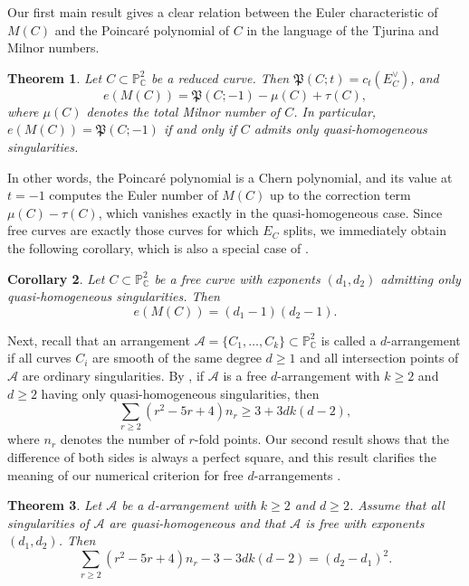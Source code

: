 \documentclass[11pt]{amsart}
\newtheorem{theorem}{Theorem}[section]
\newtheorem{corollary}[theorem]{Corollary}
\theoremstyle{definition}
\numberwithin{equation}{section}
\newcommand{\PP}{\mathbb{P}}
\newcommand{\CC}{\mathbb{C}}
\newcommand{\cA}{\mathcal{A}}
\newcommand{\Pfrak}{\mathfrak{P}}
\begin{document}
Our first main result gives a clear relation between the Euler characteristic of $M(C)$ and the Poincar\'e polynomial of $C$ in the language of the Tjurina and Milnor numbers.

\begin{theorem}\label{thm:A}
Let $C\subset\PP^2_\CC$ be a reduced curve. Then $\Pfrak(C;t)=c_t(E_C^\vee)$, and
\[
e(M(C))=\Pfrak(C;-1)-\mu(C)+\tau(C),
\]
where $\mu(C)$ denotes the total Milnor number of $C$.
In particular, $e(M(C))=\Pfrak(C;-1)$ if and only if $C$ admits only quasi-homogeneous singularities.
\end{theorem}

In other words, the Poincar\'e polynomial is a Chern polynomial, and its value at $t=-1$ computes the Euler number of $M(C)$ up to the correction term $\mu(C)-\tau(C)$, which vanishes exactly in the quasi-homogeneous case.
Since free curves are exactly those curves for which $E_C$ splits, we immediately obtain the following corollary, which is also a special case of \cite[Theorem 2.5 iv]{DS17}.

\begin{corollary}\label{cor:A}
Let $C\subset\PP^2_\CC$ be a free curve with exponents $(d_1,d_2)$ admitting only quasi-homogeneous singularities. Then
\[
e(M(C))=(d_1-1)(d_2-1).
\]
\end{corollary}

Next, recall that an arrangement $\cA=\{C_1,\dots,C_k\}\subset\PP^2_\CC$ is called a $d$-arrangement if all curves $C_i$ are smooth of the same degree $d\ge1$ and all intersection points of $\cA$ are ordinary singularities.
By \cite[Theorem~1.8]{Po25}, if $\cA$ is a free $d$-arrangement with $k\ge2$ and $d\ge2$ having only quasi-homogeneous singularities, then
\[
\sum_{r\ge2}(r^2-5r+4)n_r\ge3+3dk(d-2),
\]
where $n_r$ denotes the number of $r$-fold points.
Our second result shows that the difference of both sides is always a perfect square, and this result clarifies the meaning of our numerical criterion for free $d$-arrangements \cite[Theorem~1.8]{Po25}.

\begin{theorem}\label{thm:B}
Let $\cA$ be a $d$-arrangement with $k\ge2$ and $d\ge2$.
Assume that all singularities of $\cA$ are quasi-homogeneous and that $\cA$ is free with exponents $(d_1,d_2)$. Then
\[
\sum_{r\ge2}(r^2-5r+4)n_r-3-3dk(d-2)=(d_2-d_1)^2 .
\]
\end{theorem}
\end{document}
